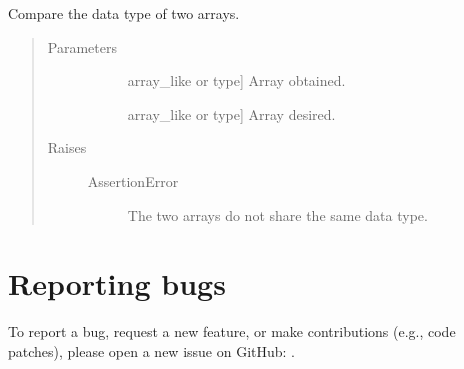 \documentclass[letterpaper,10pt,english]{sphinxmanual}
\begin{document}
\begin{fulllineitems}
\label{\detokenize{refs/generated/cobyqa.tests.assert_dtype_equal:cobyqa.tests.assert_dtype_equal}}
\sphinxAtStartPar
Compare the data type of two arrays.
\begin{quote}\begin{description}
\item[{Parameters}] \leavevmode\begin{description}
\item[{}] \leavevmode{[}array\_like or type{]}
\sphinxAtStartPar
Array obtained.

\item[{}] \leavevmode{[}array\_like or type{]}
\sphinxAtStartPar
Array desired.

\end{description}

\item[{Raises}] \leavevmode\begin{description}
\item[{AssertionError}] \leavevmode
\sphinxAtStartPar
The two arrays do not share the same data type.

\end{description}

\end{description}\end{quote}

\end{fulllineitems}



\chapter{Reporting bugs}
\label{\detokenize{bugs:reporting-bugs}}\label{\detokenize{bugs::doc}}
\sphinxAtStartPar
To report a bug, request a new feature, or make contributions
(e.g., code patches), please open a new issue on GitHub:
.
\end{document}
